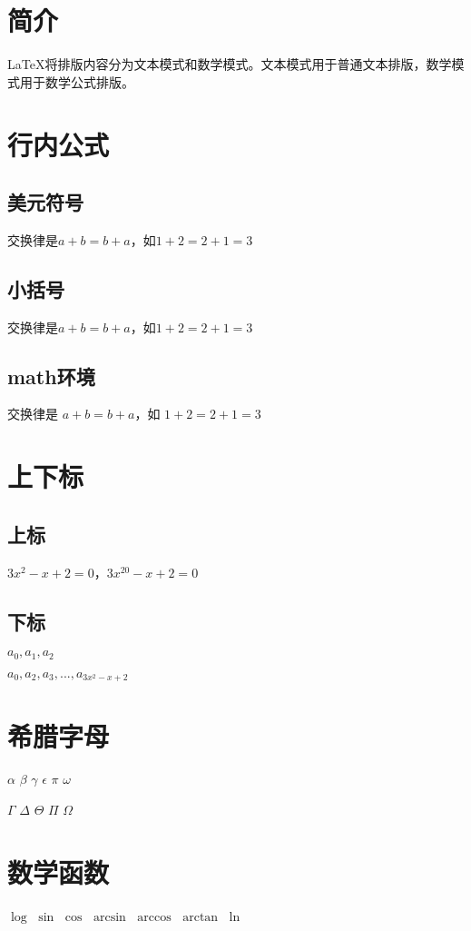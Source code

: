 \documentclass{article}
\begin{document}
    \section{简介}
    \LaTeX{}将排版内容分为文本模式和数学模式。文本模式用于普通文本排版，数学模式用于数学公式排版。
    \section{行内公式}
    \subsection{美元符号}
    交换律是$a+b=b+a$，如$1+2=2+1=3$ 
    \subsection{小括号}
    交换律是\(a+b=b+a\)，如\(1+2=2+1=3\) 
    \subsection{math环境}
    交换律是 \begin{math}a+b=b+a\end{math}，如 \begin{math}1+2=2+1=3\end{math} 
    \section{上下标}
    \subsection{上标}
    $3x^2-x+2=0$，$3x^{20}-x+2=0$
    \subsection{下标}
    $a_0, a_1, a_2$

    $a_0, a_2, a_3, ..., a_{3x^2-x+2}$
    \section{希腊字母}
    $\alpha$
    $\beta$
    $\gamma$
    $\epsilon$
    $\pi$
    $\omega$

    $\Gamma$
    $\Delta$
    $\Theta$
    $\Pi$
    $\Omega$
    \section{数学函数}
    $\log$
    $\sin$
    $\cos$
    $\arcsin$
    $\arccos$
    $\arctan$
    $\ln$
    
\end{document}
